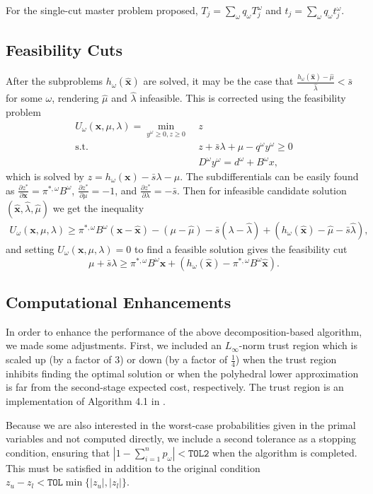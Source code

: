 \documentclass[ijoc,letterpaper]{informs3} %
\newcommand{\x}{\mathbf{x}}
\newcommand{\xh}{\hat{\x}}
\newcommand{\lh}{\hat{\lambda}}
\newcommand{\mh}{\hat{\mu}}
\newcommand{\st}{\mbox{s.t.}}
\begin{document}
For the single-cut master problem proposed, $T_j = \sum_\omega q_\omega T_j^\omega$ and $t_j = \sum_\omega q_\omega t_j^\omega$.

\subsection{Feasibility Cuts}
After the subproblems $h_\omega(\xh)$ are solved, it may be the case that $\frac{h_\omega(\xh)-\mh}{\lh} < \bar{s}$ for some $\omega$, rendering $\mh$ and $\lh$ infeasible.
This is corrected using the feasibility problem
\begin{align*}
	U_\omega(\x,\mu,\lambda) = \min_{y^\omega \geq 0, z \geq 0} \ & z \\
	\st \ & z + \bar{s}\lambda + \mu - q^\omega y^\omega \geq 0 \\
	& D^\omega y^\omega = d^\omega + B^\omega x,
\end{align*}
which is solved by $z = h_\omega(\x) - \bar{s}\lambda - \mu$.
The subdifferentials can be easily found as $\frac{\partial z^*}{\partial \x} = \pi^{*,\omega} B^\omega$, $\frac{\partial z^*}{\partial \mu} = -1$, and $\frac{\partial z^*}{\partial \lambda} = -\bar{s}$.
Then for infeasible candidate solution $(\xh,\lh,\mh)$ we get the inequality
\begin{align*}
	U_\omega(\x,\mu,\lambda) \geq \pi^{*,\omega}B^\omega(\x-\xh) - (\mu -\mh) - \bar{s}(\lambda - \lh) + (h_\omega(\xh) - \mh - \bar{s}\lh),
\end{align*}
and setting $U_\omega(\x,\mu,\lambda) = 0$ to find a feasible solution gives the feasibility cut
\[
	\mu + \bar{s} \lambda \geq \pi^{*,\omega}B^\omega \x + (h_\omega(\xh) - \pi^{*,\omega}B^\omega\xh).
\]

\subsection{Computational Enhancements}

In order to enhance the performance of the above decomposition-based algorithm, we made some adjustments.
First, we included an $L_\infty$-norm trust region which is scaled up (by a factor of $3$) or down (by a factor of $\tfrac{1}{4}$) when the trust region inhibits finding the optimal solution or when the polyhedral lower approximation is far from the second-stage expected cost, respectively.
The trust region is an implementation of Algorithm 4.1 in \cite{nocedal1999numerical}.

Because we are also interested in the worst-case probabilities given in the primal variables and not computed directly, we include a second tolerance as a stopping condition, ensuring that $\left| 1 - \sum_{i=1}^n p_\omega \right| < \texttt{TOL2}$ when the algorithm is completed.
This must be satisfied in addition to the original condition $z_u - z_l < \texttt{TOL}\min\{|z_u|,|z_l|\}$.
\end{document}

